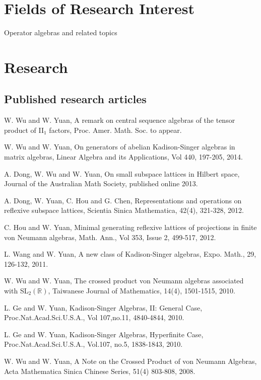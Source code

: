 \documentclass[letterpaper]{article}
\newcommand{\R}{\mathbb R}
\begin{document}
\section*{Fields of Research Interest}
Operator algebras and related topics

\section*{Research}

\subsection*{Published research articles}

\begin{etaremune}
 \item W. Wu and W. Yuan, A remark on central sequence algebras of the tensor product of II$_1$ factors, Proc. Amer. Math. Soc. to appear.

 
 \item W. Wu and W. Yuan, On generators of abelian Kadison-Singer algebras in matrix algebras, Linear Algebra and its Applications, Vol 440, 197-205, 2014.

 \item A. Dong, W. Wu and W. Yuan, On small subspace lattices in Hilbert space, Journal of the Australian Math Society, published online 2013.
 
 \item A. Dong, W. Yuan, C. Hou and G. Chen, Representations and operations on reflexive subspace lattices, Scientia Sinica Mathematica,
         42(4), 321-328, 2012.
   \item C. Hou and W. Yuan, Minimal generating reflexive lattices of projections in finite von Neumann algebras, Math. Ann., 
         Vol 353, Issue 2, 499-517, 2012.
   \item L. Wang and W. Yuan, A new class of Kadison-Singer algebras, Expo. Math., 29, 126-132, 2011.
   \item W. Wu and W. Yuan, The crossed product von Neumann algebras associated with SL$_2(\R)$, Taiwanese Journal of Mathematics, 14(4), 1501-1515, 2010.
   \item L. Ge and W. Yuan, Kadison-Singer Algebras, II: General Case, Proc.Nat.Acad.Sci.U.S.A., Vol 107,no.11, 4840-4844, 2010.
   \item L. Ge and W. Yuan, Kadison-Singer Algebras, Hyperfinite Case, Proc.Nat.Acad.Sci.U.S.A., Vol.107, no.5, 1838-1843, 2010.
   \item W. Wu and W. Yuan, A Note on the Crossed Product of von Neumann Algebras, Acta Mathematica Sinica Chinese Series, 51(4) 803-808, 2008.
\end{etaremune}
\end{document}

